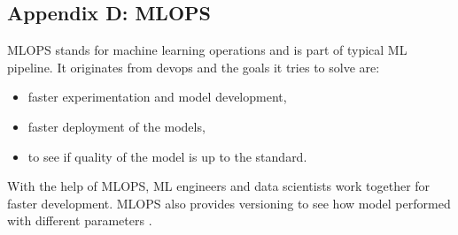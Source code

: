 \subsection{Appendix D: MLOPS}
MLOPS stands for machine learning operations and is part of typical ML pipeline. It originates from devops and the goals it tries to solve are:
\begin{itemize}
  \item faster experimentation and model development,
  \item faster deployment of the models,
  \item to see if quality of the model is up to the standard.
\end{itemize}

With the help of MLOPS, ML engineers and data scientists work together for faster development. MLOPS also provides versioning to see how model performed with different parameters \parencite{alla2021mlops}.
